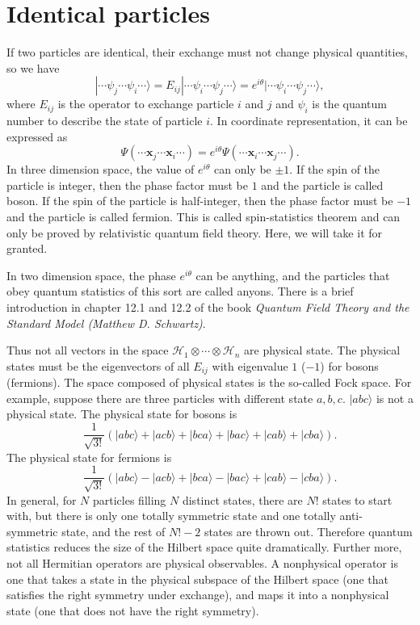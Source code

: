 \section{Identical particles}
If two particles are identical, their exchange must not change physical quantities, so we have
\[|\cdots\psi_j\cdots\psi_i\cdots\rangle = E_{ij}|\cdots\psi_i\cdots\psi_j\cdots\rangle = e^{i\theta} |\cdots\psi_i\cdots\psi_j\cdots\rangle,\]
where $E_{ij}$ is the operator to exchange particle $i$ and $j$ and $\psi_i$ is the quantum number to describe the state of particle $i$.
In coordinate representation, it can be expressed as
\[\Psi(\cdots\bm{x}_j\cdots\bm{x}_i\cdots) = e^{i\theta} \Psi(\cdots\bm{x}_i\cdots\bm{x}_j\cdots).\]
In three dimension space, the value of $e^{i\theta}$ can only be $\pm 1$. If the spin of the particle is integer, then the phase factor must be $1$ and the particle is called boson. If the spin of the particle is half-integer, then the phase factor must be $-1$ and the particle is called fermion. This is called spin-statistics theorem and can only be proved by relativistic quantum field theory. Here, we will take it for granted.
\begin{note}
In two dimension space, the phase $e^{i\theta}$ can be anything, and the particles that obey quantum statistics of this sort are called anyons. There is a brief introduction in chapter 12.1 and
12.2 of the book \emph{Quantum Field Theory and the Standard Model (Matthew D. Schwartz)}.
\end{note}
\noindent
Thus not all vectors in the space $\mathcal{H}_1\otimes\cdots\otimes\mathcal{H}_n$ are physical state. The physical states must be the eigenvectors of all $E_{ij}$ with eigenvalue $1$ ($-1$) for bosons (fermions). The space composed of physical states is the so-called Fock space. For example, suppose there are three particles with different state $a,b,c$. $|abc\rangle$ is not a physical state. The physical state for bosons is
\[\frac{1}{\sqrt{3!}} \left( |abc\rangle + |acb\rangle + |bca\rangle + |bac\rangle + |cab\rangle + |cba\rangle\right).\]
The physical state for fermions is
\[\frac{1}{\sqrt{3!}} \left( |abc\rangle - |acb\rangle + |bca\rangle - |bac\rangle + |cab\rangle - |cba\rangle\right).\]
In general, for $N$ particles filling $N$ distinct states, there are $N!$ states to start with, but there is only one totally symmetric state and one totally anti-symmetric state, and the rest of $N!-2$ states are thrown out. Therefore quantum statistics reduces the size of the Hilbert space quite dramatically.
Further more, not all Hermitian operators are physical observables. A nonphysical operator is one that takes a state in the physical subspace of the Hilbert space (one that satisfies the right symmetry under exchange), and maps it into a nonphysical state (one that does not have the right symmetry).
